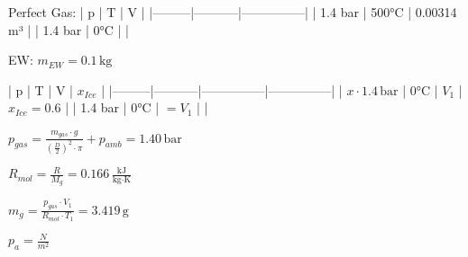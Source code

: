 Perfect Gas:  
| p       | T         | V             |  
|---------|-----------|---------------|  
| 1.4 bar | 500°C     | 0.00314 m³    |  
| 1.4 bar | 0°C       |               |  

EW:  
\( m_{EW} = 0.1 \, \text{kg} \)  

| p       | T         | V             | \( x_{Ice} \) |  
|---------|-----------|---------------|---------------|  
| \( x \cdot 1.4 \, \text{bar} \) | 0°C | \( V_1 \) | \( x_{Ice} = 0.6 \) |  
| 1.4 bar | 0°C       | \( = V_1 \)   |               |  

\( p_{gas} = \frac{m_{gas} \cdot g}{\left(\frac{D}{2}\right)^2 \cdot \pi} + p_{amb} = 1.40 \, \text{bar} \)  

\( R_{mol} = \frac{R}{M_g} = 0.166 \, \frac{\text{kJ}}{\text{kg·K}} \)  

\( m_g = \frac{p_{gas} \cdot V_1}{R_{mol} \cdot T_1} = 3.419 \, \text{g} \)  

\( p_a = \frac{N}{m^2} \)